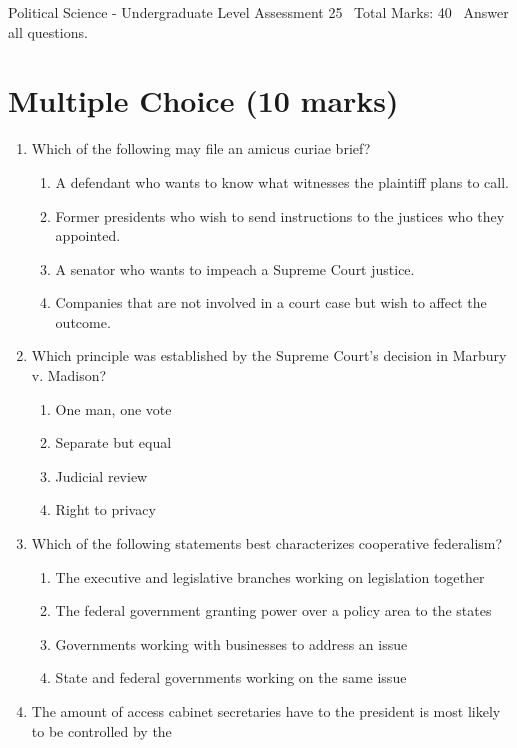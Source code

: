 \documentclass[12pt]{article}
\begin{document}
\begin{center}
Political Science - Undergraduate Level Assessment 25 \
Total Marks: 40 \
Answer all questions.
\end{center}

\section*{Multiple Choice (10 marks)}
\begin{enumerate}[label=\arabic*.]
\item Which of the following may file an amicus curiae brief?
\begin{enumerate}[label=(\alph*)]
    \item A defendant who wants to know what witnesses the plaintiff plans to call.
    \item Former presidents who wish to send instructions to the justices who they appointed.
    \item A senator who wants to impeach a Supreme Court justice.
    \item Companies that are not involved in a court case but wish to affect the outcome.
\end{enumerate}
\item Which principle was established by the Supreme Court's decision in Marbury v. Madison?
\begin{enumerate}[label=(\alph*)]
    \item One man, one vote
    \item Separate but equal
    \item Judicial review
    \item Right to privacy
\end{enumerate}
\item Which of the following statements best characterizes cooperative federalism?
\begin{enumerate}[label=(\alph*)]
    \item The executive and legislative branches working on legislation together
    \item The federal government granting power over a policy area to the states
    \item Governments working with businesses to address an issue
    \item State and federal governments working on the same issue
\end{enumerate}
\item The amount of access cabinet secretaries have to the president is most likely to be controlled by the

\end{enumerate}
\end{document}

